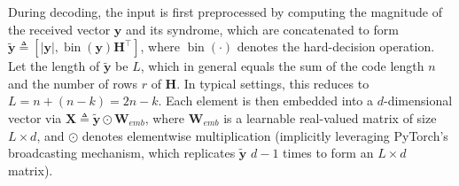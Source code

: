 \documentclass[lettersize,onecolumn]{IEEEtran}
\begin{document}
During decoding, the input is first preprocessed by computing the magnitude of the received vector $\mathbf{y}$ and its syndrome, which are concatenated to form $\tilde{\mathbf{y}} \triangleq [|\mathbf{y}|, \operatorname{bin}(\mathbf{y})\mathbf{H}^{\top}]$, where $\operatorname{bin}(\cdot)$ denotes the hard-decision operation. Let the length of $\tilde{\mathbf{y}}$ be $L$, which in general equals the sum of the code length $n$ and the number of rows $r$ of $\mathbf{H}$. In typical settings, this reduces to $L=n+(n-k)=2n-k$. Each element is then embedded into a $d$-dimensional vector via $\mathbf{X} \triangleq \tilde{\mathbf{y}} \odot \mathbf{W}_{emb} $, where $\mathbf{W}_{emb}$ is a learnable real-valued matrix of size $L\times d$, and $\odot$ denotes elementwise multiplication (implicitly leveraging PyTorch’s broadcasting mechanism, which replicates $\tilde{\mathbf{y}}$ $d-1$ times to form an $L\times d$ matrix).
\end{document}
